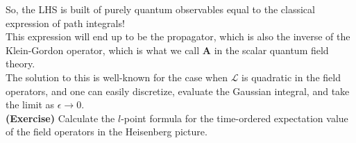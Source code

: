 \noindent So, the LHS is built of purely quantum observables equal to the classical expression of path integrals! \\

\noindent This expression will end up to be the propagator, which is also the inverse of the Klein-Gordon operator, which is what we call $\textbf{A}$ in the scalar quantum field theory. \\

\noindent The solution to this is well-known for the case when $\mathcal{L}$ is quadratic in the field operators, and one can easily discretize, evaluate the Gaussian integral, and take the limit as $\epsilon \rightarrow 0$. \\

\noindent \textbf{(Exercise)} Calculate the $l$-point formula for the time-ordered expectation value of the field operators in the Heisenberg picture.